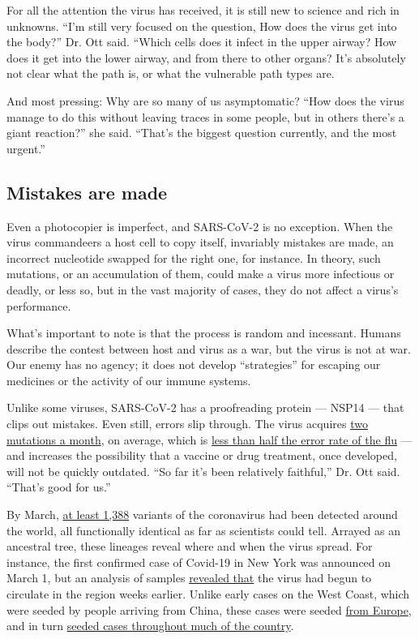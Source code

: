 For all the attention the virus has received, it is still new to science
and rich in unknowns. ``I'm still very focused on the question, How does
the virus get into the body?'' Dr. Ott said. ``Which cells does it
infect in the upper airway? How does it get into the lower airway, and
from there to other organs? It's absolutely not clear what the path is,
or what the vulnerable path types are.

And most pressing: Why are so many of us asymptomatic? ``How does the
virus manage to do this without leaving traces in some people, but in
others there's a giant reaction?'' she said. ``That's the biggest
question currently, and the most urgent.''

\hypertarget{mistakes-are-made}{%
\subsection{Mistakes are made}\label{mistakes-are-made}}

Even a photocopier is imperfect, and SARS-CoV-2 is no exception. When
the virus commandeers a host cell to copy itself, invariably mistakes
are made, an incorrect nucleotide swapped for the right one, for
instance. In theory, such mutations, or an accumulation of them, could
make a virus more infectious or deadly, or less so, but in the vast
majority of cases, they do not affect a virus's performance.

What's important to note is that the process is random and incessant.
Humans describe the contest between host and virus as a war, but the
virus is not at war. Our enemy has no agency; it does not develop
``strategies'' for escaping our medicines or the activity of our immune
systems.

Unlike some viruses, SARS-CoV-2 has a proofreading protein --- NSP14 ---
that clips out mistakes. Even still, errors slip through. The virus
acquires \href{https://bedford.io/blog/ncov-cryptic-transmission/}{two
mutations a month}, on average, which is
\href{https://jvi.asm.org/content/84/19/9733}{less than half the error
rate of the flu} --- and increases the possibility that a vaccine or
drug treatment, once developed, will not be quickly outdated. ``So far
it's been relatively faithful,'' Dr. Ott said. ``That's good for us.''

By March, \href{http://www.graphen.ai/covid.html}{at least 1,388}
variants of the coronavirus had been detected around the world, all
functionally identical as far as scientists could tell. Arrayed as an
ancestral tree, these lineages reveal where and when the virus spread.
For instance, the first confirmed case of Covid-19 in New York was
announced on March 1, but an analysis of samples
\href{https://www.nytimes.com/2020/04/08/science/new-york-coronavirus-cases-europe-genomes.htmlhttps://www.nytimes.com/2020/04/08/science/new-york-coronavirus-cases-europe-genomes.html}{revealed
that} the virus had begun to circulate in the region weeks earlier.
Unlike early cases on the West Coast, which were seeded by people
arriving from China, these cases were seeded
\href{https://nextstrain.org/narratives/ncov/sit-rep/2020-04-17?n=5}{from
Europe}, and in turn
\href{https://www.nytimes.com/2020/05/07/us/new-york-city-coronavirus-outbreak.html}{seeded
cases throughout much of the country}.

